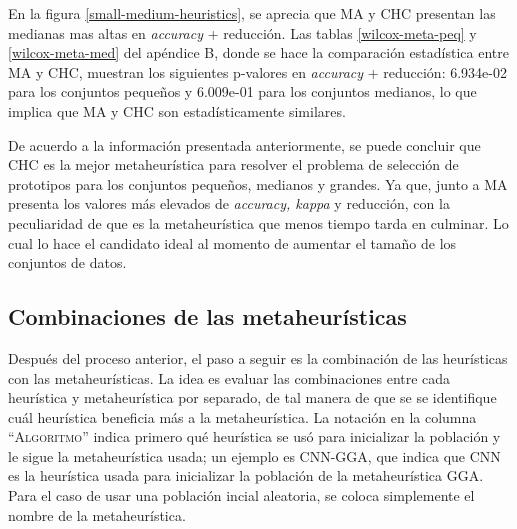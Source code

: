 %
%


En la figura \ref{small-medium-heuristics}, se aprecia que MA y CHC presentan las medianas mas altas en \emph{accuracy} + reducción. Las tablas \ref{wilcox-meta-peq} y \ref{wilcox-meta-med} del apéndice B, donde se hace la comparación estadística entre MA y CHC, muestran los siguientes p-valores en \emph{accuracy} + reducción: 6.934e-02 para los conjuntos pequeños y 6.009e-01 para los conjuntos medianos, lo que implica que MA y CHC son estadísticamente similares. 
 
De acuerdo a la información presentada anteriormente, se puede concluir que CHC es la mejor metaheurística para resolver el problema de selección de prototipos para los conjuntos pequeños, medianos y grandes. Ya que, junto a MA presenta los valores más elevados de \emph{accuracy, kappa} y reducción, con la peculiaridad de que es la metaheurística que menos tiempo tarda en culminar. Lo cual lo hace el candidato ideal al momento de aumentar el tamaño de los conjuntos de datos.  

\subsection{Combinaciones de las metaheurísticas}

Después del proceso anterior, el paso a seguir es la combinación de las heurísticas con las metaheurísticas. La idea es evaluar las combinaciones entre cada heurística y metaheurística por separado, de tal manera de que se se identifique cuál heurística beneficia más a la metaheurística. La notación en la columna ``\textsc{Algoritmo}'' indica primero qué heurística se usó para inicializar la población y le sigue la metaheurística usada; un ejemplo es CNN-GGA, que indica que CNN es la heurística usada para inicializar la población de la metaheurística GGA. Para el caso de usar una población incial aleatoria, se coloca simplemente el nombre de la metaheurística.


